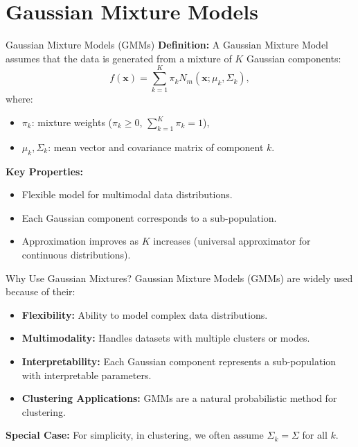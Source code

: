 \documentclass[11pt,handout,aspectratio=169]{beamer}
\begin{document}
\section{Gaussian Mixture Models}

\begin{frame}{Gaussian Mixture Models (GMMs)}
\textbf{Definition:}
A Gaussian Mixture Model assumes that the data is generated from a mixture of \( K \) Gaussian components:
\[
f(\mathbf{x}) = \sum_{k=1}^K \pi_k N_m(\mathbf{x}; \mu_k, \Sigma_k),
\]
where:
\begin{itemize}
    \item \( \pi_k \): mixture weights (\( \pi_k \geq 0 \), \( \sum_{k=1}^K \pi_k = 1 \)),
    \item \( \mu_k, \Sigma_k \): mean vector and covariance matrix of component \( k \).
\end{itemize}

\textbf{Key Properties:}
\begin{itemize}
    \item Flexible model for multimodal data distributions.
    \item Each Gaussian component corresponds to a sub-population.
    \item Approximation improves as \( K \) increases (universal approximator for continuous distributions).
\end{itemize}
\end{frame}

\begin{frame}{Why Use Gaussian Mixtures?}
Gaussian Mixture Models (GMMs) are widely used because of their:
\begin{itemize}
    \item \textbf{Flexibility:} Ability to model complex data distributions.
    \item \textbf{Multimodality:} Handles datasets with multiple clusters or modes.
    \item \textbf{Interpretability:} Each Gaussian component represents a sub-population with interpretable parameters.
    \item \textbf{Clustering Applications:} GMMs are a natural probabilistic method for clustering.
\end{itemize}

\textbf{Special Case:}
For simplicity, in clustering, we often assume \( \Sigma_k = \Sigma \) for all \( k \).
\end{frame}
\end{document}
